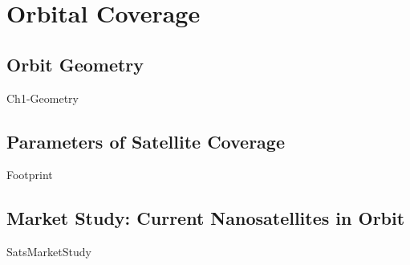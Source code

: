 \chapter{Orbital Coverage}


\section{Orbit Geometry}
{Ch1-Geometry}

\section{Parameters of Satellite Coverage}
{Footprint}




\section{Market Study: Current Nanosatellites in Orbit}
{SatsMarketStudy}